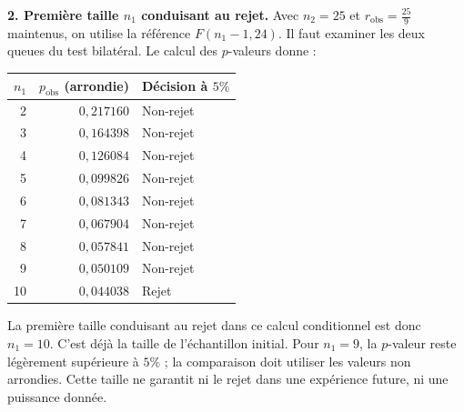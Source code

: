 {\begin{enumerate}
{\textbf{2. Première taille $n_1$ conduisant au rejet.} Avec $n_2=25$ et $r_{\mathrm{obs}}=\frac{25}{9}$ maintenus, on utilise la référence $F(n_1-1,24)$. Il faut examiner les deux queues du test bilatéral. Le calcul des $p$-valeurs donne :
\begin{center}
\begin{tabular}{rrl}\hline
$n_1$ & $p_{\mathrm{obs}}$ (arrondie) & Décision à $5\%$ \\ \hline
2 & $0{,}217160$ & Non-rejet \\
3 & $0{,}164398$ & Non-rejet \\
4 & $0{,}126084$ & Non-rejet \\
5 & $0{,}099826$ & Non-rejet \\
6 & $0{,}081343$ & Non-rejet \\
7 & $0{,}067904$ & Non-rejet \\
8 & $0{,}057841$ & Non-rejet \\
9 & $0{,}050109$ & Non-rejet \\
10 & $0{,}044038$ & Rejet \\ \hline
\end{tabular}
\end{center}
La première taille conduisant au rejet dans ce calcul conditionnel est donc $\boxed{n_1=10}$. C'est déjà la taille de l'échantillon initial. Pour $n_1=9$, la $p$-valeur reste légèrement supérieure à $5\%$ ; la comparaison doit utiliser les valeurs non arrondies.
Cette taille ne garantit ni le rejet dans une expérience future, ni une puissance donnée.

}
\end{enumerate}}
